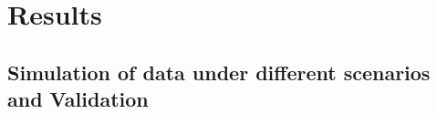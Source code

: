 \documentclass[a4paper,11pt]{article}
\begin{document}
%
%

\section{Results}
\subsection{Simulation of data under different scenarios and Validation}
\end{document}
